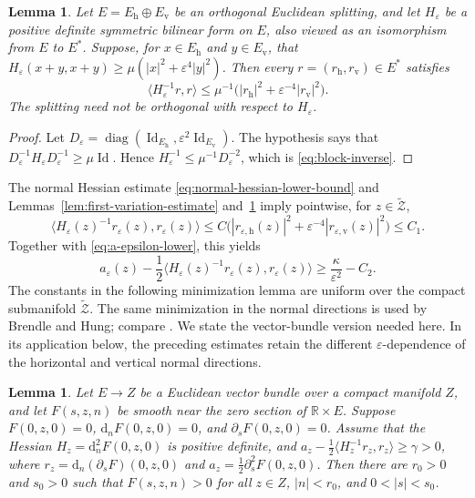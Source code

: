 \documentclass[11pt]{article}
\newtheorem{lemma}[theorem]{Lemma}
\theoremstyle{definition}
\theoremstyle{remark}
\newcommand{\R}{\mathbb R}
\newcommand{\tZ}{\widetilde{\mathcal Z}}
\newcommand{\Id}{\operatorname{Id}}
\newcommand{\dd}{\mathrm d}
\newcommand{\eps}{\varepsilon}
\begin{document}
\begin{lemma}                                                                       \label{lem:block-inverse}
Let $E=E_{\mathrm h}\oplus E_{\mathrm v}$ be an orthogonal Euclidean splitting,
and let $H_\eps$ be a positive definite symmetric bilinear form on $E$, also
viewed as an isomorphism from $E$ to $E^*$.  Suppose, for $x\in E_{\mathrm h}$
and $y\in E_{\mathrm v}$, that
$H_\eps(x+y,x+y)\geq\mu(|x|^2+\eps^4|y|^2)$.  Then every
$r=(r_{\mathrm h},r_{\mathrm v})\in E^*$ satisfies
\begin{equation}                                                                    \label{eq:block-inverse}
 \langle H_\eps^{-1}r,r\rangle
 \leq\mu^{-1}\bigl(|r_{\mathrm h}|^2+\eps^{-4}|r_{\mathrm v}|^2\bigr).
\end{equation}
The splitting need not be orthogonal with respect to $H_\eps$.
\end{lemma}

\begin{proof}
Let $D_\eps=\operatorname{diag}(\Id_{E_{\mathrm h}},\eps^2\Id_{E_{\mathrm v}})$.  The
hypothesis says that
$D_\eps^{-1}H_\eps D_\eps^{-1}\geq\mu\Id$.  Hence
$H_\eps^{-1}
\leq\mu^{-1}D_\eps^{-2}$, which is \eqref{eq:block-inverse}.
\end{proof}

The normal Hessian estimate \eqref{eq:normal-hessian-lower-bound} and
Lemmas~\ref{lem:first-variation-estimate} and~\ref{lem:block-inverse} imply
pointwise, for $z\in\tZ$,
\[
 \langle H_\eps(z)^{-1}r_\eps(z),r_\eps(z)\rangle
 \leq C\bigl(|r_{\eps,\mathrm h}(z)|^2+\eps^{-4}|r_{\eps,\mathrm v}(z)|^2\bigr)\leq C_1.
\]
Together with \eqref{eq:a-epsilon-lower}, this yields
\begin{equation}                                                                    \label{eq:reduced-coefficient}
 a_\eps(z)
 -\frac12\langle H_\eps(z)^{-1}r_\eps(z),r_\eps(z)\rangle
 \geq\frac{\kappa}{\eps^2}-C_2.
\end{equation}
The constants in the following minimization lemma are uniform over the
compact submanifold $\tZ$.  The same minimization in the normal directions
is used by Brendle and Hung; compare
\cite[Lemma~2.1]{BrendleHung2026}.  We state the
vector-bundle version needed here.  In its application below, the preceding
estimates retain the different $\eps$-dependence of the horizontal and
vertical normal directions.

\begin{lemma}                                                                       \label{lem:tubular-minimization}
Let $E\to Z$ be a Euclidean vector bundle over a compact manifold $Z$, and let
$F(s,z,n)$ be smooth near the zero section of $\R\times E$.  Suppose
$F(0,z,0)=0$, $\dd_n F(0,z,0)=0$, and $\partial_s F(0,z,0)=0$.  Assume that the Hessian
$H_z=\dd_n^2F(0,z,0)$ is positive definite, and
$a_z-\frac12\langle H_z^{-1}r_z,r_z\rangle\geq\gamma>0$,
where $r_z=\dd_n(\partial_s F)(0,z,0)$ and
$a_z=\tfrac12\partial_s^2 F(0,z,0)$.  Then there are $r_0>0$ and $s_0>0$ such that
$F(s,z,n)>0$ for all $z\in Z$, $|n|<r_0$, and $0<|s|<s_0$.
\end{lemma}
\end{document}
